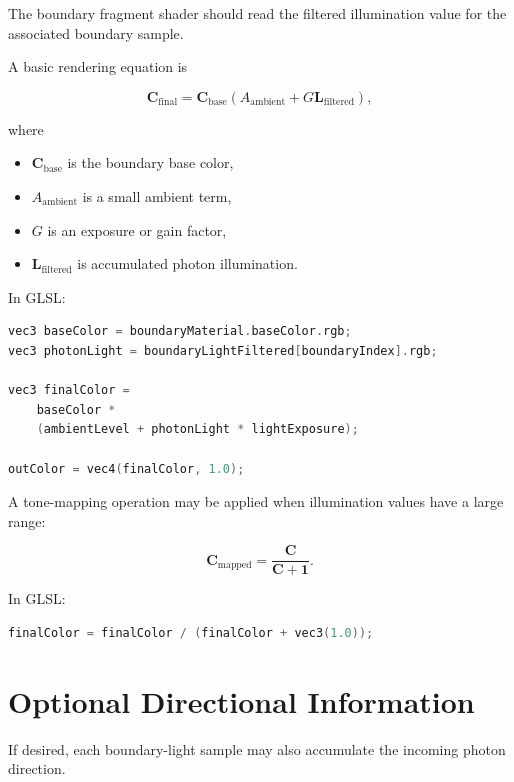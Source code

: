 \documentclass[11pt]{article}
\begin{document}
The boundary fragment shader should read the filtered illumination value for the
associated boundary sample.

A basic rendering equation is

\begin{equation}
    \mathbf{C}_{\mathrm{final}}
    =
    \mathbf{C}_{\mathrm{base}}
    \left(
        A_{\mathrm{ambient}}
        +
        G\mathbf{L}_{\mathrm{filtered}}
    \right),
\end{equation}

where

\begin{itemize}
    \item $\mathbf{C}_{\mathrm{base}}$ is the boundary base color,
    \item $A_{\mathrm{ambient}}$ is a small ambient term,
    \item $G$ is an exposure or gain factor,
    \item $\mathbf{L}_{\mathrm{filtered}}$ is accumulated photon illumination.
\end{itemize}

In GLSL:

\begin{lstlisting}[language=C++]
vec3 baseColor = boundaryMaterial.baseColor.rgb;
vec3 photonLight = boundaryLightFiltered[boundaryIndex].rgb;

vec3 finalColor =
    baseColor *
    (ambientLevel + photonLight * lightExposure);

outColor = vec4(finalColor, 1.0);
\end{lstlisting}

A tone-mapping operation may be applied when illumination values have a large
range:

\begin{equation}
    \mathbf{C}_{\mathrm{mapped}}
    =
    \frac{\mathbf{C}}
    {\mathbf{C}+\mathbf{1}}.
\end{equation}

In GLSL:

\begin{lstlisting}[language=C++]
finalColor = finalColor / (finalColor + vec3(1.0));
\end{lstlisting}

\section{Optional Directional Information}

If desired, each boundary-light sample may also accumulate the incoming photon
direction.
\end{document}
